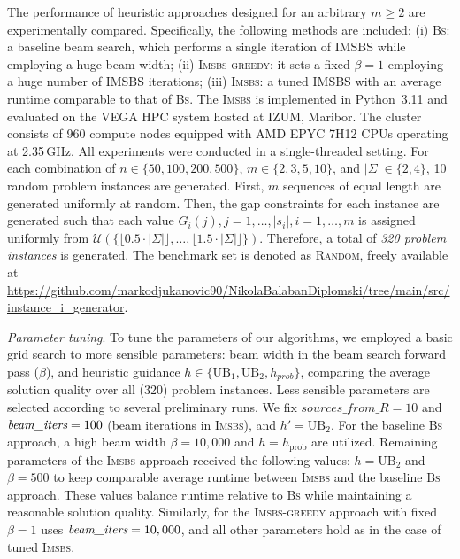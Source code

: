 \documentclass[runningheads]{llncs}
\begin{document}
The performance of heuristic approaches designed for an arbitrary \( m \geq 2 \) are experimentally compared. Specifically, the following methods are included: (i) \textsc{Bs}: a baseline beam search, which performs a single iteration of IMSBS while employing a huge beam width; (ii) \textsc{Imsbs-greedy}: it sets a fixed  \( \beta = 1 \) %
   employing a huge number of IMSBS iterations; (iii) \textsc{Imsbs}: a tuned IMSBS with an average runtime comparable to that of \textsc{Bs}.	 The \textsc{Imsbs} is implemented in Python~3.11 and evaluated on the VEGA HPC system hosted at IZUM, Maribor. The cluster consists of 960 compute nodes equipped with AMD EPYC 7H12 CPUs operating at 2.35\,GHz. All experiments were conducted in a single-threaded setting.  For each combination of  $n \in \{50, 100, 200, 500\}$, $m \in \{2, 3, 5, 10\}$, and $|\Sigma| \in \{2, 4\}$, 10 random problem instances are generated. First, $m$ sequences of equal length are generated uniformly at random. Then, the gap constraints for each instance are generated such that each value $G_i(j), j=1, \ldots, |s_i|, i=1, \ldots, m$ is  assigned uniformly from 
 $\mathcal{U}(\{ \lfloor 0.5 \cdot |\Sigma| \rfloor, \ldots, \lfloor 1.5 \cdot |\Sigma| \rfloor \})$.  Therefore, a total of \textit{320 problem instances} is generated. The benchmark set is denoted as \textsc{Random}, freely available at   
 \url{https://github.com/markodjukanovic90/NikolaBalabanDiplomski/tree/main/src/instance_i_generator}.
 
 \textit{Parameter tuning}. 
 To tune the parameters of our algorithms, 
 we employed a basic grid search to more sensible parameters: beam width in the beam search forward pass ($\beta$), and heuristic guidance  $h \in \{\text{UB}_1, \text{UB}_2, h_{prob}\}$, comparing the average solution quality over all (320) problem instances.  Less sensible parameters are selected according to several preliminary runs.  %
 We fix ${{sources\_from\_R}} = 10$ and $\emph{beam\_iters} = 100$ (beam iterations in \textsc{Imsbs}), and %
  $h' = \textrm{UB}_2$.   For the baseline \textsc{Bs} approach, a high beam width $\beta = 10,000$ and $h = h_{\text{prob}}$ are utilized. %
  Remaining parameters of the \textsc{Imsbs} approach received the following values: $h=\text{UB}_2$ and $\beta=500$ to keep comparable average runtime between \textsc{Imsbs} and the baseline \textsc{Bs} approach. These values balance runtime relative to \textsc{Bs} while maintaining a reasonable solution quality.  Similarly, for the \textsc{Imsbs-greedy} approach with fixed $\beta = 1$ uses  $\emph{beam\_iters} = 10,000$, and all other parameters hold as in the case of tuned \textsc{Imsbs}.  
  
\end{document}
